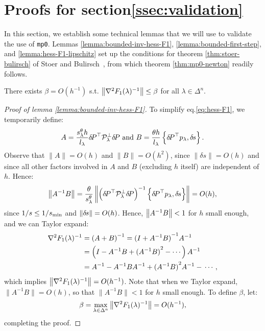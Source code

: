 \documentclass[smallcondensed]{svjour3}
\begin{document}
\section{Proofs for
  section\@ \ref{ssec:validation}}\label{app:validation-proofs} In this section, we establish some technical lemmas that we will use
to validate the use of \texttt{mp0}. Lemmas
\ref{lemma:bounded-inv-hess-F1}, \ref{lemma:bounded-first-step}, and
\ref{lemma:hess-F1-lipschitz} set up the conditions for theorem
\ref{thm:stoer-bulirsch} of Stoer and
Bulirsch~\cite{stoer2013introduction}, from which theorem
\ref{thm:mp0-newton} readily follows.

\begin{lemma}\label{lemma:bounded-inv-hess-F1}
  There exists $\beta = O(h^{-1})$ s.t.
  $\left\|\nabla^2 F_1(\lambda)^{-1}\right\| \leq \beta$ for all
  $\lambda \in \Delta^n$.
\end{lemma}

\begin{proof}[Proof of lemma \ref{lemma:bounded-inv-hess-F1}]
  To simplify eq.\@ \ref{eq:hess-F1}, we temporarily define:
  \begin{equation}
    A = \frac{s^\theta_\lambda h}{l_\lambda} {\delta \hspace{-0.14em} P}^\top \mathcal{P}^\perp_\lambda {\delta \hspace{-0.14em} P} \mbox{ and } B = \frac{\theta h}{l_\lambda} \left\{{\delta \hspace{-0.14em} P}^\top p_\lambda, {\delta \hspace{-0.1em} s}\right\}.
  \end{equation}
  Observe that $\|A\| = O(h)$ and $\|B\| = O(h^2)$, since
  $\|\delta s\| = O(h)$ and since all other factors involved in $A$
  and $B$ (excluding $h$ itself) are independent of $h$. Hence:
  \begin{equation}
    \left\|A^{-1} B\right\| = \frac{\theta}{s^\theta_\lambda} \left\|\left({\delta \hspace{-0.14em} P}^\top \mathcal{P}^\perp_\lambda {\delta \hspace{-0.14em} P}\right)^{-1} \left\{{\delta \hspace{-0.14em} P}^\top p_\lambda, {\delta \hspace{-0.1em} s}\right\}\right\| = O(h),
  \end{equation}
  since $1/s \leq 1/s_{\operatorname{min}}$ and $\left\|{\delta \hspace{-0.1em} s}\right\| = O(h)$. Hence,
  $\left\|A^{-1} B\right\| < 1$ for $h$ small enough, and we can Taylor
  expand:
  \begin{equation}
    \begin{aligned}
      \nabla^2 F_1(\lambda)^{-1} &= \left(A + B\right)^{-1} = {(I + A^{-1} B)}^{-1} A^{-1} \\
      &= \left(I - A^{-1} B + {(A^{-1} B)}^2 - \cdots\right) A^{-1} \\
      &= A^{-1} - A^{-1} B A^{-1} + {(A^{-1} B)}^2 A^{-1} - \,\cdots,
    \end{aligned}
  \end{equation}
  which implies $\left\|\nabla^2 F_1(\lambda)^{-1}\right\| = O(h^{-1})$. Note
  that when we Taylor expand, $\|A^{-1} B\| = O(h)$, so that
  $\|A^{-1} B\| < 1$ for $h$ small enough. To define $\beta$, let:
  \begin{equation}
    \beta = \max_{\lambda \in \Delta^n} \left\|\nabla^2 F_1(\lambda)^{-1}\right\| = O(h^{-1}),
  \end{equation}
  completing the proof.
\end{proof}
\end{document}
